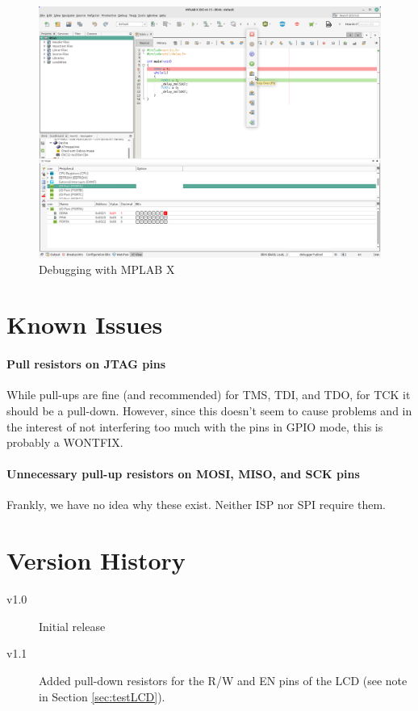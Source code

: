 \documentclass{article}
\begin{document}
\begin{figure}[htb]
\centering
\includegraphics[width=\textwidth]{Pictures/DebugMPLABX2.png}
\caption{Debugging with MPLAB X}
\label{fig:debugMplabX2}
\end{figure}

\section{Known Issues}
\paragraph{Pull resistors on JTAG pins}
While pull-ups are fine (and recommended) for TMS, TDI, and TDO, for TCK it should be a pull-down. However, since this doesn't seem to cause problems and in the interest of not interfering too much with the pins in GPIO mode, this is probably a WONTFIX. 
\paragraph{Unnecessary pull-up resistors on MOSI, MISO, and SCK pins}
Frankly, we have no idea why these exist. Neither ISP nor SPI require them. 

\section{Version History}
\begin{description}
\item[v1.0] Initial release
\item[v1.1] Added pull-down resistors for the R/W and EN pins of the LCD (see note in Section \ref{sec:testLCD}). 
\end{description}
\end{document}
